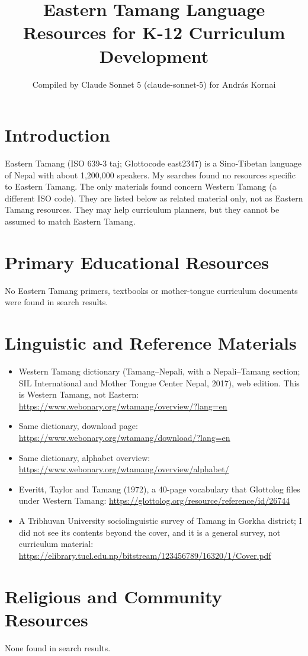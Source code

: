 \documentclass[12pt]{article}
\title{Eastern Tamang Language Resources for K-12 Curriculum Development}
\author{Compiled by Claude Sonnet 5 (claude-sonnet-5) for Andr\'as Kornai}
\date{}
\begin{document}
\maketitle
\section{Introduction}
Eastern Tamang (ISO 639-3 taj; Glottocode east2347) is a Sino-Tibetan language of Nepal with about 1,200,000 speakers. My searches found no resources specific to Eastern Tamang. The only materials found concern Western Tamang (a different ISO code). They are listed below as related material only, not as Eastern Tamang resources. They may help curriculum planners, but they cannot be assumed to match Eastern Tamang.
\section{Primary Educational Resources}
No Eastern Tamang primers, textbooks or mother-tongue curriculum documents were found in search results.
\section{Linguistic and Reference Materials}
\begin{itemize}
\item Western Tamang dictionary (Tamang--Nepali, with a Nepali--Tamang section; SIL International and Mother Tongue Center Nepal, 2017), web edition. This is Western Tamang, not Eastern: \url{https://www.webonary.org/wtamang/overview/?lang=en}
\item Same dictionary, download page: \url{https://www.webonary.org/wtamang/download/?lang=en}
\item Same dictionary, alphabet overview: \url{https://www.webonary.org/wtamang/overview/alphabet/}
\item Everitt, Taylor and Tamang (1972), a 40-page vocabulary that Glottolog files under Western Tamang: \url{https://glottolog.org/resource/reference/id/26744}
\item A Tribhuvan University sociolinguistic survey of Tamang in Gorkha district; I did not see its contents beyond the cover, and it is a general survey, not curriculum material: \url{https://elibrary.tucl.edu.np/bitstream/123456789/16320/1/Cover.pdf}
\end{itemize}
\section{Religious and Community Resources}
None found in search results.
\end{document}
